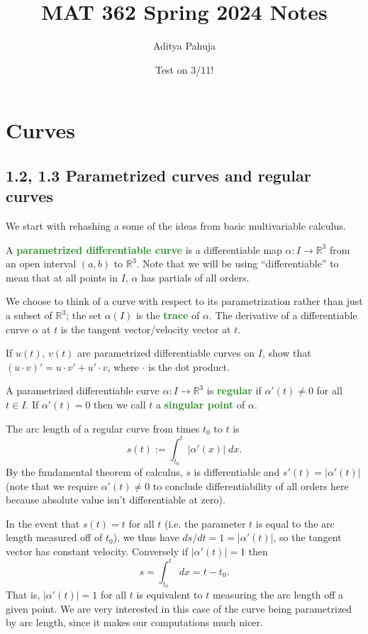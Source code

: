 \documentclass[10pt]{scrartcl}
\title{\vspace{-2.0cm} MAT 362 Spring 2024 Notes}
\author{\large Aditya Pahuja}
\date{\large Test on 3/11!}
\providecommand{\RR}{\mathbb R}
\providecommand{\dif}{\;d}
\providecommand{\vocab}[1]{{\textbf{\textcolor{ForestGreen}{#1}}}}
\begin{document}
\maketitle
\tableofcontents
\pagebreak

\section{Curves}
\renewcommand{\thesubsection}{\S}
\subsection{1.2, 1.3 Parametrized curves and regular curves}
We start with rehashing a some of the ideas
from basic multivariable calculus.

\begin{definition}
	A \vocab{parametrized differentiable curve}
	is a differentiable map $\alpha\colon I\to\RR^3$
	from an open interval $(a,b)$ to $\RR^3$.
	Note that we will be using ``differentiable'' to mean that
	at all points in $I$, $\alpha$ has partials of all orders.
\end{definition}

We choose to think of a curve with respect to its parametrization
rather than just a subset of $\RR^3$; the set $\alpha(I)$ is the
\vocab{trace} of $\alpha$.
The derivative of a differentiable curve $\alpha$ at $t$
is the tangent vector/velocity vector at $t$.

\begin{exercise}
	If $u(t)$, $v(t)$ are parametrized differentiable curves on $I$,
	show that $(u\cdot v)' = u\cdot v' + u'\cdot v$, where $\cdot$
	is the dot product.
\end{exercise}

\begin{definition}
	A parametrized differentiable curve $\alpha\colon I\to\RR^3$
	is \vocab{regular} if $\alpha'(t)\ne 0$ for all $t\in I$.
	If $\alpha'(t) = 0$ then we call $t$ a \vocab{singular point}
	of $\alpha$.
\end{definition}

The arc length of a regular curve from times $t_0$ to $t$ is 
\[s(t) := \int_{t_0}^t |\alpha'(x)|\dif x.\]
By the fundamental theorem of calculus, $s$ is differentiable
and $s'(t) = |\alpha'(t)|$
(note that we require $\alpha'(t)\ne 0$ to conclude differentiability
of all orders here because absolute value isn't differentiable at zero).

In the event that $s(t) = t$ for all $t$ (i.e. the parameter $t$
is equal to the arc length measured off of $t_0$), we thus have
$ds/dt = 1 = |\alpha'(t)|$, so the tangent vector has constant velocity.
Conversely if $|\alpha'(t)| = 1$ then
\[s = \int_{t_0}^t \dif x = t - t_0.\]
That is, $|\alpha'(t)| = 1$ for all $t$ is equivalent to $t$
measuring the arc length off a given point.
We are very interested in this case of the curve
being parametrized by arc length, since it makes our computations much nicer.
\end{document}
